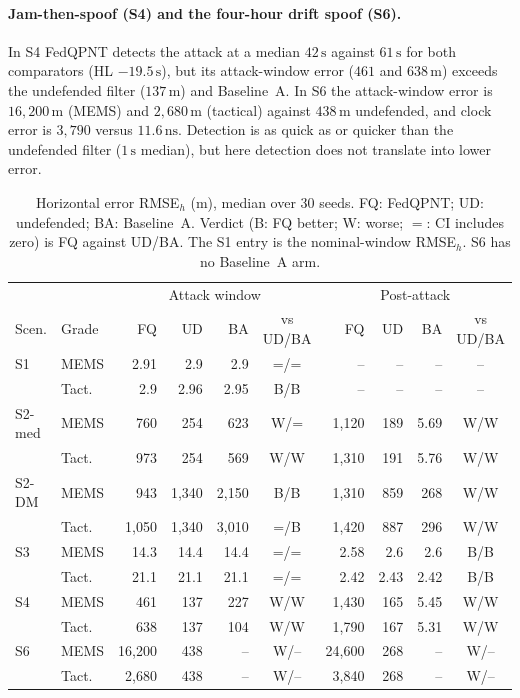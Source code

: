\documentclass[12pt,a4paper]{article}
\begin{document}
\paragraph{Jam-then-spoof (S4) and the four-hour drift spoof (S6).} In S4 FedQPNT detects the attack at a median $42\,\mathrm{s}$ against $61\,\mathrm{s}$ for both comparators (HL $-19.5\,\mathrm{s}$), but its attack-window error ($461$ and $638\,\mathrm{m}$) exceeds the undefended filter ($137\,\mathrm{m}$) and Baseline~A. In S6 the attack-window error is $16{,}200\,\mathrm{m}$ (MEMS) and $2{,}680\,\mathrm{m}$ (tactical) against $438\,\mathrm{m}$ undefended, and clock error is $3{,}790$ versus $11.6\,\mathrm{ns}$. Detection is as quick as or quicker than the undefended filter ($1\,\mathrm{s}$ median), but here detection does not translate into lower error.

\begin{table}[ht]
\centering
\caption{Horizontal error RMSE$_h$ (m), median over 30 seeds. FQ: FedQPNT; UD: undefended; BA: Baseline~A. Verdict (B: FQ better; W: worse; $=$: CI includes zero) is FQ against UD/BA. The S1 entry is the nominal-window RMSE$_h$. S6 has no Baseline~A arm.}
\label{tab:head1}
\scriptsize
\setlength{\tabcolsep}{3pt}
\begin{tabular}{llrrrcrrrc}
\toprule
 & & \multicolumn{4}{c}{Attack window} & \multicolumn{4}{c}{Post-attack} \\
\cmidrule(lr){3-6}\cmidrule(lr){7-10}
Scen. & Grade & FQ & UD & BA & vs UD/BA & FQ & UD & BA & vs UD/BA \\
\midrule
S1 & MEMS & 2.91 & 2.9 & 2.9 & =/= & -- & -- & -- & -- \\
 & Tact. & 2.9 & 2.96 & 2.95 & B/B & -- & -- & -- & -- \\
S2-med & MEMS & 760 & 254 & 623 & W/= & 1{,}120 & 189 & 5.69 & W/W \\
 & Tact. & 973 & 254 & 569 & W/W & 1{,}310 & 191 & 5.76 & W/W \\
S2-DM & MEMS & 943 & 1{,}340 & 2{,}150 & B/B & 1{,}310 & 859 & 268 & W/W \\
 & Tact. & 1{,}050 & 1{,}340 & 3{,}010 & =/B & 1{,}420 & 887 & 296 & W/W \\
S3 & MEMS & 14.3 & 14.4 & 14.4 & =/= & 2.58 & 2.6 & 2.6 & B/B \\
 & Tact. & 21.1 & 21.1 & 21.1 & =/= & 2.42 & 2.43 & 2.42 & B/B \\
S4 & MEMS & 461 & 137 & 227 & W/W & 1{,}430 & 165 & 5.45 & W/W \\
 & Tact. & 638 & 137 & 104 & W/W & 1{,}790 & 167 & 5.31 & W/W \\
S6 & MEMS & 16{,}200 & 438 & -- & W/-- & 24{,}600 & 268 & -- & W/-- \\
 & Tact. & 2{,}680 & 438 & -- & W/-- & 3{,}840 & 268 & -- & W/-- \\
\bottomrule
\end{tabular}
\end{table}
\end{document}
